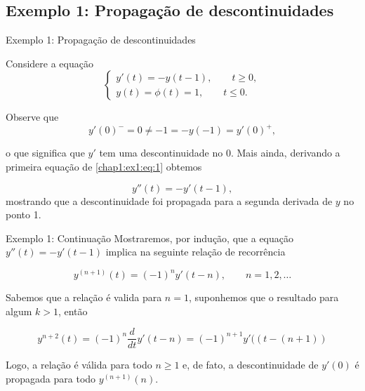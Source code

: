 \documentclass{beamer}
\theoremstyle{plain}
\theoremstyle{definition}
\begin{document}

\subsection{Exemplo 1: Propagação de descontinuidades}
\begin{frame}{Exemplo 1: Propagação de descontinuidades}

        Considere a equação
        \begin{equation}
            \begin{cases}
                y'(t) = -y(t - 1), \qquad t \geq 0, \\
                y(t) = \phi(t) = 1, \qquad t \leq 0.
            \end{cases} 
            \label{chap1:ex1:eq:1}
        \end{equation}


        \noindent
        Observe que
        \[
            y'(0)^- = 0 \neq -1 = -y(-1) = y'(0)^+,
        \]

        \noindent
        o que significa que $y'$ tem uma descontinuidade no 0. Mais ainda, derivando a primeira equação de \eqref{chap1:ex1:eq:1} obtemos

        \noindent
        \begin{equation*}
            y''(t) = - y'(t - 1) ,
            \label{ex_intro1_eq1}
        \end{equation*}
        mostrando que a descontinuidade foi propagada para a segunda derivada de $y$ no ponto 1.  
\end{frame}



\begin{frame}{Exemplo 1: Continuação}
        Mostraremos, por indução, que a equação $ y''(t) = - y'(t - 1)$ implica na seguinte relação de recorrência

        \begin{equation*}
            y^{(n+1)}(t) = (-1)^n y' (t-n), \qquad n = 1, 2, \dots
            \label{ex_intro1_eq2}
        \end{equation*} 

        Sabemos que a relação é valida para $n = 1$, suponhemos que o resultado para algum $k>1$, então 
    
        \[
            y^{n+2}(t) = (-1)^n \frac{d}{dt} y' (t-n) = (-1)^{n+1} y'((t-(n+1))
        \]

        Logo, a relação é válida para todo $n \geq 1$ e, de fato, a descontinuidade de $y'(0)$ é propagada para todo $y^{(n+1)}(n)$.

\end{frame}
\end{document}
